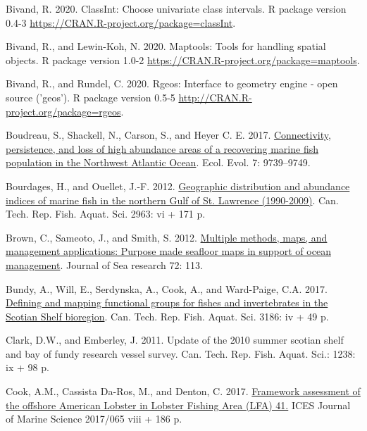 \documentclass[12pt]{article}\usepackage[]{graphicx}\usepackage[]{color}
\begin{document}
\leavevmode\hypertarget{ref-R:package:classInt}{}%
Bivand, R. 2020. ClassInt: Choose univariate class intervals. R package version 0.4-3 \url{https://CRAN.R-project.org/package=classInt}.

\leavevmode\hypertarget{ref-R:package:maptools}{}%
Bivand, R., and Lewin-Koh, N. 2020. Maptools: Tools for handling spatial objects. R package version 1.0-2 \url{https://CRAN.R-project.org/package=maptools}.

\leavevmode\hypertarget{ref-R:package:rgeos}{}%
Bivand, R., and Rundel, C. 2020. Rgeos: Interface to geometry engine - open source ('geos'). R package version 0.5-5 \url{http://CRAN.R-project.org/package=rgeos}.

\leavevmode\hypertarget{ref-Boudreau:2017}{}%
Boudreau, S., Shackell, N., Carson, S., and Heyer C. E. 2017. \href{https://www.sciencedirect.com/science/article/pii/S138511011200055X\#s0025}{Connectivity, persistence, and loss of high abundance areas of a recovering marine fish population in the Northwest Atlantic Ocean}. Ecol. Evol. 7: 9739--9749.

\leavevmode\hypertarget{ref-Bourdages:NGatlas:2012}{}%
Bourdages, H., and Ouellet, J.-F. 2012. \href{http://publications.gc.ca/site/eng/425663/publication.html}{Geographic distribution and abundance indices of marine fish in the northern Gulf of St. Lawrence (1990-2009)}. Can. Tech. Rep. Fish. Aquat. Sci. 2963: vi + 171 p.

\leavevmode\hypertarget{ref-Brown:2012}{}%
Brown, C., Sameoto, J., and Smith, S. 2012. \href{https://www.sciencedirect.com/science/article/pii/S138511011200055X\#s0025}{Multiple methods, maps, and management applications: Purpose made seafloor maps in support of ocean management}. Journal of Sea research 72: 113.

\leavevmode\hypertarget{ref-Bundyetal2017}{}%
Bundy, A., Will, E., Serdynska, A., Cook, A., and Ward-Paige, C.A. 2017. \href{http://publications.gc.ca/collections/collection_2017/mpo-dfo/Fs97-6-3186-eng.pdf}{Defining and mapping functional groups for fishes and invertebrates in the Scotian Shelf bioregion}. Can. Tech. Rep. Fish. Aquat. Sci. 3186: iv + 49 p.

\leavevmode\hypertarget{ref-ClarkEmberley2011}{}%
Clark, D.W., and Emberley, J. 2011. Update of the 2010 summer scotian shelf and bay of fundy research vessel survey. Can. Tech. Rep. Fish. Aquat. Sci.: 1238: ix + 98 p.

\leavevmode\hypertarget{ref-Cook:2017}{}%
Cook, A.M., Cassista Da-Ros, M., and Denton, C. 2017. \href{https://waves-vagues.dfo-mpo.gc.ca/Library/40644881.pdf}{Framework assessment of the offshore American Lobster in Lobster Fishing Area (LFA) 41.} ICES Journal of Marine Science 2017/065 viii + 186 p.
\end{document}
